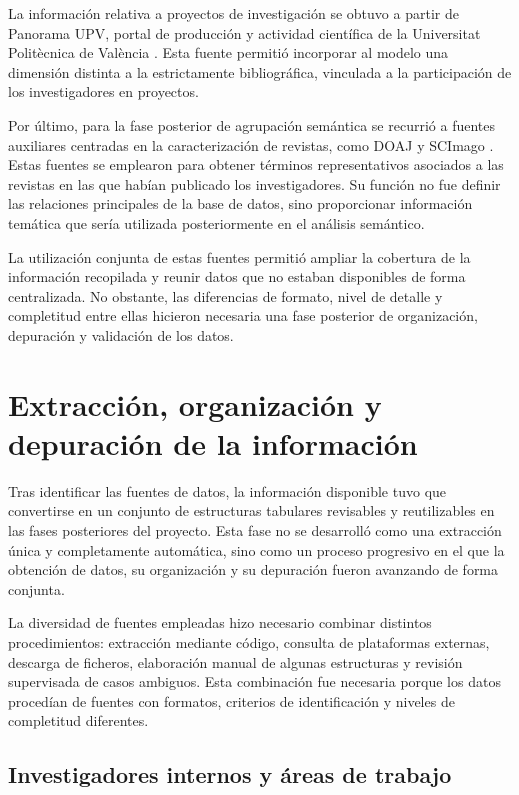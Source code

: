 \documentclass[11pt,spanish,listoffigures,listoftables]{tfgetsinf}
\begin{document}
La información relativa a proyectos de investigación se obtuvo a partir de Panorama UPV, portal de producción y actividad científica de la Universitat Politècnica de València \cite{panorama_upv}. Esta fuente permitió incorporar al modelo una dimensión distinta a la estrictamente bibliográfica, vinculada a la participación de los investigadores en proyectos.

Por último, para la fase posterior de agrupación semántica se recurrió a fuentes auxiliares centradas en la caracterización de revistas, como DOAJ y SCImago \cite{doaj,scimago}. Estas fuentes se emplearon para obtener términos representativos asociados a las revistas en las que habían publicado los investigadores. Su función no fue definir las relaciones principales de la base de datos, sino proporcionar información temática que sería utilizada posteriormente en el análisis semántico.

La utilización conjunta de estas fuentes permitió ampliar la cobertura de la información recopilada y reunir datos que no estaban disponibles de forma centralizada. No obstante, las diferencias de formato, nivel de detalle y completitud entre ellas hicieron necesaria una fase posterior de organización, depuración y validación de los datos.

\section{Extracción, organización y depuración de la información}

Tras identificar las fuentes de datos, la información disponible tuvo que convertirse en un conjunto de estructuras tabulares revisables y reutilizables en las fases posteriores del proyecto. Esta fase no se desarrolló como una extracción única y completamente automática, sino como un proceso progresivo en el que la obtención de datos, su organización y su depuración fueron avanzando de forma conjunta.

La diversidad de fuentes empleadas hizo necesario combinar distintos procedimientos: extracción mediante código, consulta de plataformas externas, descarga de ficheros, elaboración manual de algunas estructuras y revisión supervisada de casos ambiguos. Esta combinación fue necesaria porque los datos procedían de fuentes con formatos, criterios de identificación y niveles de completitud diferentes.

\subsection{Investigadores internos y áreas de trabajo}
\end{document}
